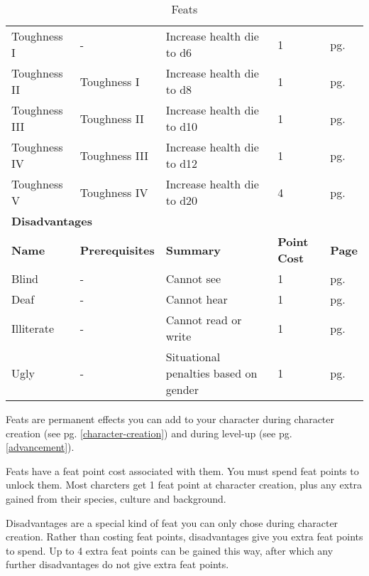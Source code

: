 \begin{multicols*}{2}
\begin{table*}[ht]
\begin{tabularx}{\textwidth}{l X X l l}
            Toughness I & - & Increase health die to d6 & 1 & pg. \pageref{feat:toughness1} \\
            \quad Toughness II & Toughness I & Increase health die to d8 & 1 & pg. \pageref{feat:toughness2} \\
            \quad Toughness III & Toughness II & Increase health die to d10 & 1 & pg. \pageref{feat:toughness3} \\
            \quad Toughness IV & Toughness III & Increase health die to d12 & 1 & pg. \pageref{feat:toughness4} \\
            \quad Toughness V & Toughness IV & Increase health die to d20 & 4 & pg. \pageref{feat:toughness5} \\
            \multicolumn{5}{l}{\textbf{Disadvantages}} \\
            \textbf{Name} & \textbf{Prerequisites} & \textbf{Summary} & \textbf{Point Cost} & \textbf{Page} \\
            Blind & - & Cannot see & 1 & pg. \pageref{flaw:blind} \\
            Deaf & - & Cannot hear & 1 & pg. \pageref{flaw:deaf} \\
            Illiterate & - & Cannot read or write & 1 & pg. \pageref{flaw:illiterate} \\
            Ugly & - & Situational penalties based on gender & 1 & pg. \pageref{flaw:ugly} \\
        \end{tabularx}
        \caption{Feats}
        \label{tab:feats}
    \end{table*}

    Feats are permanent effects you can add to your character during character
    creation (see pg. \ref{character-creation}) and during level-up (see pg.
    \ref{advancement}).

    Feats have a feat point cost associated with them. You must spend feat
    points to unlock them. Most charcters get 1 feat point at character
    creation, plus any extra gained from their species, culture and background.

    Disadvantages are a special kind of feat you can only chose during
    character creation. Rather than costing feat points, disadvantages give you
    extra feat points to spend. Up to 4 extra feat points can be gained this
    way, after which any further disadvantages do not give extra feat points.


\end{multicols*}
